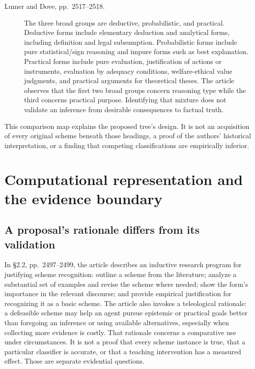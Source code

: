 \begin{description}
\item[Lumer and Dove, pp.~2517--2518.]
The three broad groups are deductive, probabilistic, and practical.
Deductive forms include elementary deduction and analytical forms,
including definition and legal subsumption.
Probabilistic forms include pure statistical/sign reasoning and
impure forms such as best explanation.
Practical forms include pure evaluation, justification of actions
or instruments, evaluation by adequacy conditions, welfare-ethical
value judgments, and practical arguments for theoretical theses.
The article observes that the first two broad groups concern
reasoning type while the third concerns practical purpose.
Identifying that mixture does not validate an inference from
desirable consequences to factual truth.
\end{description}

This comparison map explains the proposed tree's design.
It is not an acquisition of every original scheme beneath those
headings, a proof of the authors' historical interpretation, or
a finding that competing classifications are empirically inferior.

\section{Computational representation and the evidence boundary}
\label{sec:p18-scheme-computational-boundary}

\subsection{A proposal's rationale differs from its validation}

In \S2.2, pp.~2497--2499, the article describes an inductive
research program for justifying scheme recognition:
outline a scheme from the literature; analyze a substantial set
of examples and revise the scheme where needed; show the form's
importance in the relevant discourse; and provide empirical
justification for recognizing it as a basic scheme.
The article also invokes a teleological rationale: a defeasible
scheme may help an agent pursue epistemic or practical goals
better than foregoing an inference or using available alternatives,
especially when collecting more evidence is costly.
That rationale concerns a comparative use under circumstances.
It is not a proof that every scheme instance is true, that a
particular classifier is accurate, or that a teaching intervention
has a measured effect. Those are separate evidential questions.

